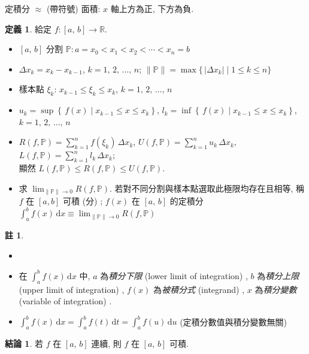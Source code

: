 \documentclass[12pt]{extarticle}
\newcommand{\ds}{\displaystyle}
\theoremstyle{definition}
\newtheorem*{dfn}{定義}
\newtheorem*{fact}{結論}
\newtheorem*{rmk}{註}
\begin{document}
定積分 $\approx$  (帶符號) 面積: $x$ 軸上方為正, 下方為負. 

\begin{dfn}
  給定 $f:[a,\,b]\to\mathbb{R}$. 
  \begin{itemize}\setlength{\itemsep}{0pt}
    \item $[a,\,b]$ 分割 $\ds\mathbb{P}: a = x_0 < x_1 < x_2 < \cdots < x_n = b$
    \item $\ds\Delta x_k=x_k - x_{k-1}$, $k=1,\,2,\,\ldots,\,n$; $\ds\|\mathbb{P}\| = \max\{\,|\Delta x_k|\;|\;1\leqslant k\leqslant n\}$
    \item 樣本點 $\ds\xi_k$: $\ds x_{k-1} \leqslant \xi_k \leqslant x_k$, $k=1,\,2,\,\ldots,\,n$
    \item $\ds u_k = \sup\left\{\,f(x)\;|\;x_{k-1}\leqslant x\leqslant x_k\right\}$, $l_k = \inf\left\{\,f(x)\;|\;x_{k-1}\leqslant x\leqslant x_k\right\}$, $k=1,\,2,\,\ldots,\,n$
    \item $\ds R(f,\mathbb{P}) = \sum_{k=1}^n f(\xi_k)\,\Delta x_k$, $\ds U(f,\mathbb{P}) = \sum_{k=1}^n u_k\,\Delta x_k$, $\ds L(f,\mathbb{P}) = \sum_{k=1}^n l_k\,\Delta x_k$; \\顯然 $\ds L(f,\mathbb{P})\leqslant R(f,\mathbb{P})\leqslant U(f, \mathbb{P})$. 
    \item 求 $\ds\lim_{\|\mathbb{P}\|\to 0} R(f,\mathbb{P})$. 若對不同分割與樣本點選取此極限均存在且相等, 稱 $f$ 在 $[a, b]$ 可積 (分) ; $f(x)$ 在 $[a,\,b]$ 的定積分 $\ds\int_a^b f(x)\,\mathrm{d}x \equiv \lim_{\|\mathbb{P}\|\to 0} R(f,\mathbb{P})$
  \end{itemize}
\end{dfn}

\begin{rmk}
  \begin{itemize}\setlength{\itemsep}{0pt}
    \item[]
    \item 在 $\ds\int_a^b f(x)\,\text{d}x$ 中, $a$ 為\emph{積分下限} (lower limit of integration) , $b$ 為\emph{積分上限} (upper limit of integration) , $f(x)$ 為\emph{被積分式} (integrand) , $x$ 為\emph{積分變數} (variable of integration) . 
    \item $\ds\int_a^b f(x)\,\text{d}x = \int_a^b f(t)\,\text{d}t = \int_a^b f(u)\,\text{d}u$  (定積分數值與積分變數無關) 
  \end{itemize}
\end{rmk}

\begin{fact}
  若 $f$ 在 $[a,\,b]$ 連續, 則 $f$ 在 $[a,\,b]$ 可積. 
\end{fact}
\end{document}
